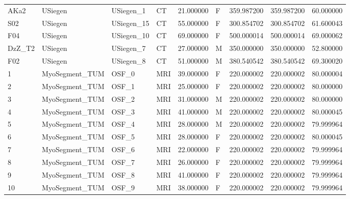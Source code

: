 \begin{tabular}{llllrlrrr}
AKa2   &         USiegen &    USiegen\_1 &                 CT &  21.000000 &        F &       359.987200 &    359.987200 &   60.000000 \\
S02    &         USiegen &   USiegen\_15 &                 CT &  55.000000 &        F &       300.854702 &    300.854702 &   61.600043 \\
F04    &         USiegen &   USiegen\_10 &                 CT &  69.000000 &        F &       500.000014 &    500.000014 &   69.000062 \\
DzZ\_T2 &         USiegen &    USiegen\_7 &                 CT &  27.000000 &        M &       350.000000 &    350.000000 &   52.800000 \\
F02    &         USiegen &    USiegen\_8 &                 CT &  51.000000 &        M &       380.540542 &    380.540542 &   69.300020 \\
1      &  MyoSegment\_TUM &        OSF\_0 &                MRI &  39.000000 &        F &       220.000002 &    220.000002 &   80.000004 \\
2      &  MyoSegment\_TUM &        OSF\_1 &                MRI &  25.000000 &        F &       220.000002 &    220.000002 &   80.000000 \\
3      &  MyoSegment\_TUM &        OSF\_2 &                MRI &  31.000000 &        M &       220.000002 &    220.000002 &   80.000000 \\
4      &  MyoSegment\_TUM &        OSF\_3 &                MRI &  41.000000 &        M &       220.000002 &    220.000002 &   80.000045 \\
5      &  MyoSegment\_TUM &        OSF\_4 &                MRI &  28.000000 &        M &       220.000002 &    220.000002 &   79.999964 \\
6      &  MyoSegment\_TUM &        OSF\_5 &                MRI &  28.000000 &        F &       220.000002 &    220.000002 &   80.000045 \\
7      &  MyoSegment\_TUM &        OSF\_6 &                MRI &  22.000000 &        F &       220.000002 &    220.000002 &   79.999964 \\
8      &  MyoSegment\_TUM &        OSF\_7 &                MRI &  26.000000 &        F &       220.000002 &    220.000002 &   79.999964 \\
9      &  MyoSegment\_TUM &        OSF\_8 &                MRI &  41.000000 &        F &       220.000002 &    220.000002 &   79.999964 \\
10     &  MyoSegment\_TUM &        OSF\_9 &                MRI &  38.000000 &        F &       220.000002 &    220.000002 &   79.999964 \\

\end{tabular}
